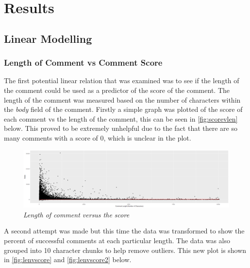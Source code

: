\chapter{Results}\label{ch:Results}

\section{Linear Modelling}

\subsection{Length of Comment vs Comment Score}
    The first potential linear relation that was examined was to see if the length of the comment could be used as a predictor of the score of the comment. The length of the comment was measured based on the number of characters within the \textit{body} field of the comment. Firstly a simple graph was plotted of the score of each comment vs the length of the comment, this can be seen in \autoref{fig:scorevlen} below. This proved to be extremely unhelpful due to the fact that there are so many comments with a score of 0, which is unclear in the plot.
    
    \begin{figure}[H]
        \centering
        \includegraphics[width=1.0\textwidth]{graphs/length_score_all_subs}
        \caption{\textit{Length of comment versus the score}}
        \label{fig:scorevlen}
    \end{figure}
    
    A second attempt was made but this time the data was transformed to show the percent of successful comments at each particular length. The data was also grouped into 10 character chunks to help remove outliers. This new plot is shown in \autoref{fig:lenvscore} and \autoref{fig:lenvscore2} below.
    
